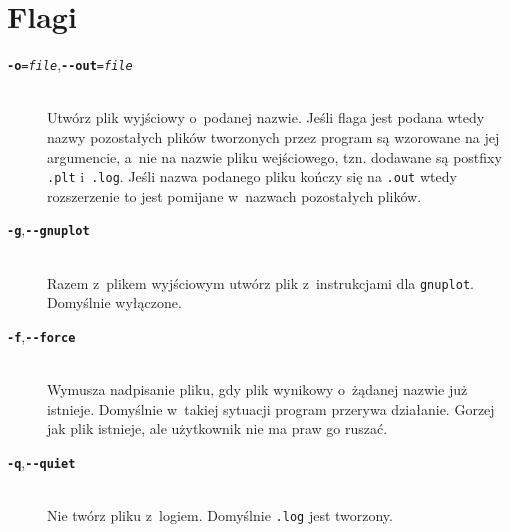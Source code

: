 \documentclass[10pt,a4paper]{article}
\newcommand{\prog}[1]{\texttt{#1}}
\newcommand{\flag}[1]{\textbf{\prog{#1}}}
\begin{document}
\section{Flagi}
\label{sec:flagi}

\begin{description}
  \item[\flag{-o}{\tt\textsl{=file}},\quad\flag{-\--out}{\tt\textsl{=file}}] \hfill \\
    Utwórz plik wyjściowy o~podanej nazwie. Jeśli flaga jest podana wtedy nazwy
    pozostałych plików tworzonych przez program są wzorowane na jej argumencie,
    a~nie na nazwie pliku wejściowego, tzn. dodawane są postfixy \prog{.plt}
    i~\prog{.log}. Jeśli nazwa podanego pliku kończy się na \prog{.out} wtedy
    rozszerzenie to jest pomijane w~nazwach pozostałych plików.
  \item[\flag{-g},\quad\flag{-\--gnuplot}] \hfill \\
    Razem z~plikem wyjściowym utwórz plik z~instrukcjami dla \prog{gnuplot}.
    Domyślnie wyłączone.
  \item[\flag{-f},\quad\flag{-\--force}] \hfill \\
    Wymusza nadpisanie pliku, gdy plik wynikowy o~żądanej nazwie już istnieje.
    Domyślnie w~takiej sytuacji program przerywa działanie. Gorzej jak plik
    istnieje, ale użytkownik nie ma praw go ruszać.
  \item[\flag{-q},\quad\flag{-\--quiet}] \hfill \\
    Nie twórz pliku z~logiem. Domyślnie \prog{.log} jest tworzony.
\end{description}
\end{document}
